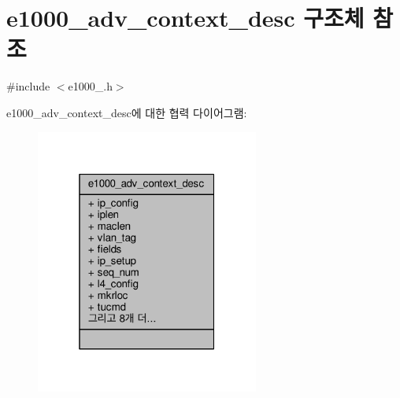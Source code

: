 \hypertarget{structe1000__adv__context__desc}{}\section{e1000\+\_\+adv\+\_\+context\+\_\+desc 구조체 참조}
\label{structe1000__adv__context__desc}


{\ttfamily \#include $<$e1000\+\_.\+h$>$}



e1000\+\_\+adv\+\_\+context\+\_\+desc에 대한 협력 다이어그램\+:
\nopagebreak
\begin{figure}[H]
\begin{center}
\leavevmode
\includegraphics[width=208pt]{structe1000__adv__context__desc__coll__graph}
\end{center}
\end{figure}
